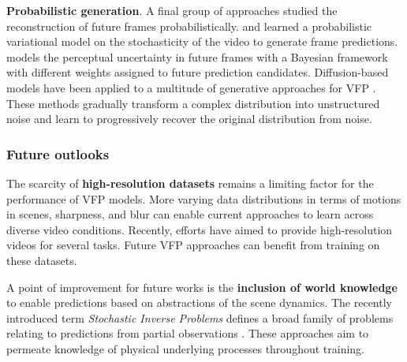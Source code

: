 \noindent
\textbf{Probabilistic generation}. A final group of approaches studied the reconstruction of future frames probabilistically.  and  learned a probabilistic variational model on the stochasticity of the video to generate frame predictions.  models the perceptual uncertainty in future frames with a Bayesian framework with different weights assigned to future prediction candidates. Diffusion-based models  have been applied to a multitude of generative approaches for VFP . These methods gradually transform a complex distribution into unstructured noise and learn to progressively recover the original distribution from noise.

\subsubsection{Future outlooks}
\label{sec:prediction::VFP:::outlooks}


The scarcity of \textbf{high-resolution datasets} remains a limiting factor for the performance of VFP models. More varying data distributions in terms of motions in scenes, sharpness, and blur can enable current approaches to learn across diverse video conditions. Recently, efforts  have aimed to provide high-resolution videos for several tasks. Future VFP approaches can benefit from training on these datasets. 

A point of improvement for future works is the \textbf{inclusion of world knowledge} to enable predictions based on abstractions of the scene dynamics. The recently introduced term \textit{Stochastic Inverse Problems} defines a broad family of problems relating to predictions from partial observations . These approaches aim to permeate knowledge of physical underlying processes throughout training.



